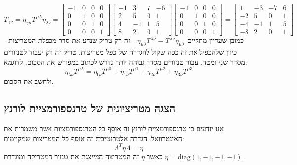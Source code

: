 \documentclass{tstextbook}
\begin{document}
\begin{example}
$$ {T}_{\gamma\nu}=\eta _{\gamma \mu}T^{\mu\lambda}\eta_{\lambda\nu}=\begin{bmatrix}-1&0&0&0\\0&1&0&0\\0&0&1&0\\0&0&0&1\end{bmatrix}\begin{bmatrix}-1&3&7&-6\\2&5&0&1\\4&-1&1&5\\8&2&0&1\end{bmatrix}\begin{bmatrix}-1&0&0&0\\0&1&0&0\\0&0&1&0\\0&0&0&1\end{bmatrix}=\begin{bmatrix}1&-3&-7&6\\-2&5&0&1\\-4&-1&1&5\\-8&2&0&1\end{bmatrix}$$
כמובן שעדיין מתקיים \(\eta_{\mu \lambda}T^{\lambda \nu}=T^{\lambda \nu}\eta_{\mu \lambda}\) - זה רק טריק שנדע את סדר מכפלת המטריצות - כיוון שלהכפיל את זה ככה שקול להגדרה של כפל מטריצות. טריק זה רק יעבוד לטנזורים מסדר שני ומטה. עבור טנזורים מסדר גבוהה יותר נדרש לכתוב במפורש את הסכום. לדוגמא:
$$\eta_{\lambda \nu}T^{\mu \lambda}=\eta_{0\nu}T^{\mu 0}+\eta_{1\nu}T^{\mu 1}+\eta_{2 \nu}T^{\mu 2}+\eta_{3 \nu} T^{\mu 3}$$
ולחשב את הסכום.

\end{example}
\subsection{הצגה מטריציונית של טרנספורמציית לורנץ}

אנו יודעים כי טרנספורמציית לורנץ זה אוסף כל הטרנספורמציות אשר משמרות את האינטרוואל. הגדרה אלטרנטיבית זה אוסף כל המטריצות שמקיימות:
$$\Lambda^{T} \eta \Lambda=\eta$$
כאשר \(\eta\) זה המטריצה המייצגת את טנזור המטריקה ומוגדרת \(\eta=\mathrm{diag}(1,-1,-1,-1)\).
\end{document}
